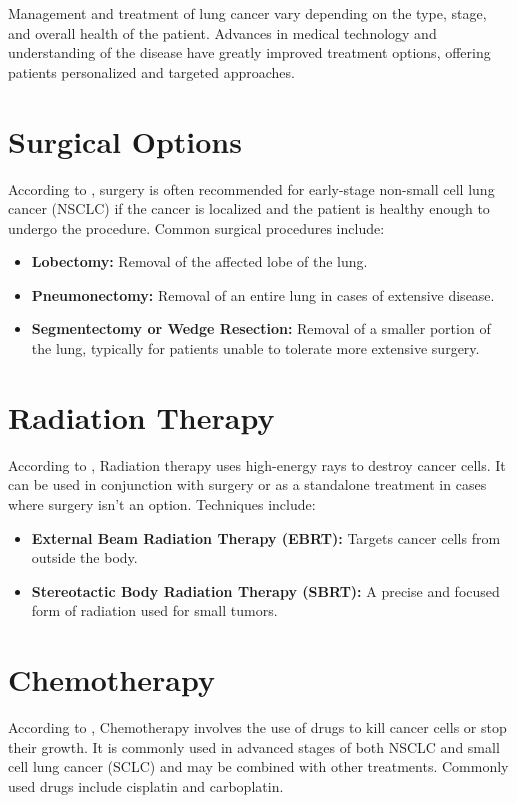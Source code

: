 Management and treatment of lung cancer vary depending on the type, stage, and overall health of the patient. Advances in medical technology and understanding of the disease have greatly improved treatment options, offering patients personalized and targeted approaches.

\section{Surgical Options}
According to \cite{hoy2019surgical}, surgery is often recommended for early-stage non-small cell lung cancer (NSCLC) if the cancer is localized and the patient is healthy enough to undergo the procedure. Common surgical procedures include:
\begin{itemize}
    \item \textbf{Lobectomy:} Removal of the affected lobe of the lung.
    \item \textbf{Pneumonectomy:} Removal of an entire lung in cases of extensive disease.
    \item \textbf{Segmentectomy or Wedge Resection:} Removal of a smaller portion of the lung, typically for patients unable to tolerate more extensive surgery.
\end{itemize}

\section{Radiation Therapy}
According to \cite{de2013state}, Radiation therapy uses high-energy rays to destroy cancer cells. It can be used in conjunction with surgery or as a standalone treatment in cases where surgery isn’t an option. Techniques include:
\begin{itemize}
    \item \textbf{External Beam Radiation Therapy (EBRT):} Targets cancer cells from outside the body.
    \item \textbf{Stereotactic Body Radiation Therapy (SBRT):} A precise and focused form of radiation used for small tumors.
\end{itemize}

\section{Chemotherapy}
According to \cite{ihde1992chemotherapy}, Chemotherapy involves the use of drugs to kill cancer cells or stop their growth. It is commonly used in advanced stages of both NSCLC and small cell lung cancer (SCLC) and may be combined with other treatments. Commonly used drugs include cisplatin and carboplatin.

